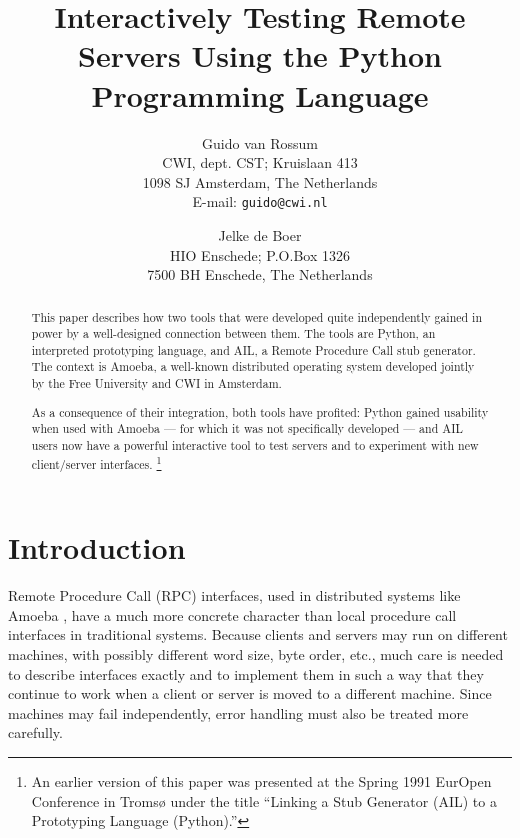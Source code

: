 
\title{
Interactively Testing Remote Servers Using the Python Programming Language
}

\author{
	Guido van Rossum \\
	CWI, dept. CST; Kruislaan 413 \\
	1098 SJ Amsterdam, The Netherlands \\
	E-mail: {\tt guido@cwi.nl}
\and
	Jelke de Boer \\
	HIO Enschede; P.O.Box 1326 \\
	7500 BH  Enschede, The Netherlands
}



\maketitle

\begin{abstract}
This paper describes how two tools that were developed quite
independently gained in power by a well-designed connection between
them.  The tools are Python, an interpreted prototyping language, and
AIL, a Remote Procedure Call stub generator.  The context is Amoeba, a
well-known distributed operating system developed jointly by the Free
University and CWI in Amsterdam.

As a consequence of their integration, both tools have profited:
Python gained usability when used with Amoeba --- for which it was not
specifically developed --- and AIL users now have a powerful
interactive tool to test servers and to experiment with new
client/server interfaces.%
\footnote{
An earlier version of this paper was presented at the Spring 1991
EurOpen Conference in Troms{\o} under the title ``Linking a Stub
Generator (AIL) to a Prototyping Language (Python).''
}
\end{abstract}

\section{Introduction}

Remote Procedure Call (RPC) interfaces, used in distributed systems
like Amoeba
\cite{Amoeba:IEEE,Amoeba:CACM},
have a much more concrete character than local procedure call
interfaces in traditional systems.  Because clients and servers may
run on different machines, with possibly different word size, byte
order, etc., much care is needed to describe interfaces exactly and to
implement them in such a way that they continue to work when a client
or server is moved to a different machine.  Since machines may fail
independently, error handling must also be treated more carefully.

